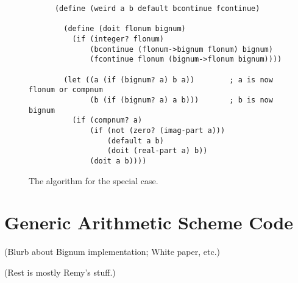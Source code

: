 \begin{figure}[hbt]
\begin{verbatim}
      (define (weird a b default bcontinue fcontinue)

        (define (doit flonum bignum)
          (if (integer? flonum)
              (bcontinue (flonum->bignum flonum) bignum)
              (fcontinue flonum (bignum->flonum bignum))))
      
        (let ((a (if (bignum? a) b a))        ; a is now flonum or compnum
              (b (if (bignum? a) a b)))       ; b is now bignum
          (if (compnum? a)
              (if (not (zero? (imag-part a)))
                  (default a b)
                  (doit (real-part a) b))
              (doit a b))))
\end{verbatim}
\caption{The algorithm for the special case.}
\label{weird}
\end{figure}

\section{Generic Arithmetic Scheme Code}

(Blurb about Bignum implementation; White paper, etc.)

(Rest is mostly Remy's stuff.)


